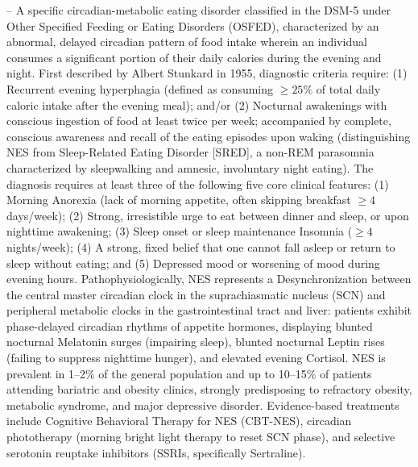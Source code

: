 -- A specific circadian-metabolic eating disorder classified in the DSM-5 under Other Specified Feeding or Eating Disorders (OSFED), characterized by an abnormal, delayed circadian pattern of food intake wherein an individual consumes a significant portion of their daily calories during the evening and night. First described by Albert Stunkard in 1955, diagnostic criteria require: (1) Recurrent evening hyperphagia (defined as consuming $\ge 25\%$ of total daily caloric intake after the evening meal); and/or (2) Nocturnal awakenings with conscious ingestion of food at least twice per week; accompanied by complete, conscious awareness and recall of the eating episodes upon waking (distinguishing NES from Sleep-Related Eating Disorder [SRED], a non-REM parasomnia characterized by sleepwalking and amnesic, involuntary night eating). The diagnosis requires at least three of the following five core clinical features: (1) Morning Anorexia (lack of morning appetite, often skipping breakfast $\ge 4$ days/week); (2) Strong, irresistible urge to eat between dinner and sleep, or upon nighttime awakening; (3) Sleep onset or sleep maintenance Insomnia ($\ge 4$ nights/week); (4) A strong, fixed belief that one cannot fall asleep or return to sleep without eating; and (5) Depressed mood or worsening of mood during evening hours. Pathophysiologically, NES represents a Desynchronization between the central master circadian clock in the suprachiasmatic nucleus (SCN) and peripheral metabolic clocks in the gastrointestinal tract and liver: patients exhibit phase-delayed circadian rhythms of appetite hormones, displaying blunted nocturnal Melatonin surges (impairing sleep), blunted nocturnal Leptin rises (failing to suppress nighttime hunger), and elevated evening Cortisol. NES is prevalent in 1--2\% of the general population and up to 10--15\% of patients attending bariatric and obesity clinics, strongly predisposing to refractory obesity, metabolic syndrome, and major depressive disorder. Evidence-based treatments include Cognitive Behavioral Therapy for NES (CBT-NES), circadian phototherapy (morning bright light therapy to reset SCN phase), and selective serotonin reuptake inhibitors (SSRIs, specifically Sertraline).

